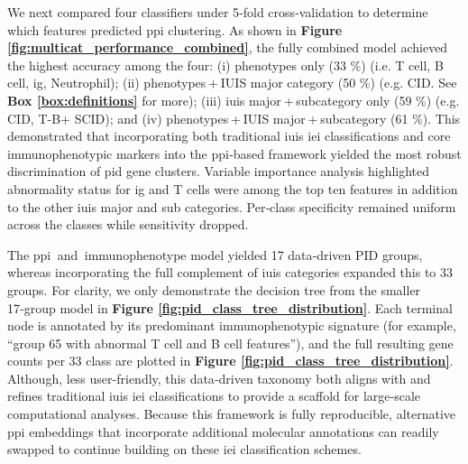 We next compared four classifiers under 5‑fold cross‑validation to determine which features predicted \ac{ppi} clustering.
As shown in \textbf{Figure \ref{fig:multicat_performance_combined}}, the fully combined model achieved the highest accuracy among the four:
(i) phenotypes only (33 \%) (i.e. T cell, B cell, \ac{ig}, Neutrophil);
(ii) phenotypes + IUIS major category (50 \%) (e.g. CID. See \textbf{Box \ref{box:definitions}} for more);
(iii) \ac{iuis} major + subcategory only (59 \%) (e.g. CID, T-B+ SCID); and
(iv) phenotypes + IUIS major + subcategory  (61 \%).
This demonstrated that incorporating both traditional \ac{iuis} \ac{iei} classifications and core immunophenotypic markers into the \ac{ppi}‑based framework yielded the most robust discrimination of \ac{pid} gene clusters.
Variable importance analysis highlighted abnormality status for \ac{ig} and T cells
were among the top ten features in addition to the other \ac{iuis} major and sub categories. 
Per‑class specificity remained uniform across the classes while sensitivity dropped.

The \ac{ppi}  and  immunophenotype model yielded 17 data‑driven PID groups, whereas incorporating the full complement of \ac{iuis} categories expanded this to 33 groups. 
For clarity, we only demonstrate the decision tree from the smaller 17‑group model in 
\textbf{Figure \ref{fig:pid_class_tree_distribution}}.
Each terminal node is annotated by its predominant immunophenotypic signature (for example, ``group 65 with abnormal T cell and B cell features''), and the full resulting gene counts per 33 class are plotted in 
\textbf{Figure \ref{fig:pid_class_tree_distribution}}.
Although, less user-friendly, this data‑driven taxonomy 
both aligns with and refines traditional \ac{iuis} \ac{iei} classifications
to provide a scaffold for large‑scale computational analyses.
Because this framework is fully reproducible, alternative \ac{ppi} embeddings that incorporate additional molecular annotations can readily swapped to continue building on these \ac{iei} classification schemes.

